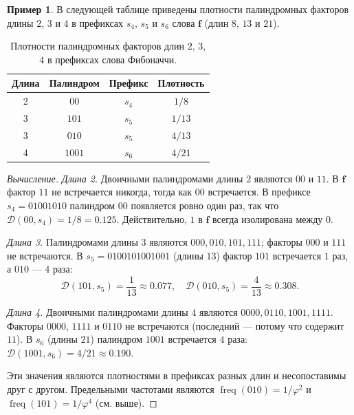 \documentclass[a4paper,14pt]{extreport}
\theoremstyle{plain}
\theoremstyle{definition}
\newtheorem{example}{Пример}
\theoremstyle{remark}
\begin{document}
\begin{example}\label{thm6.2}
	В следующей таблице приведены плотности палиндромных факторов длины $2$, $3$ и $4$
	в префиксах $s_4$, $s_5$ и $s_6$ слова $\mathbf f$ (длин $8$, $13$ и $21$).
	\begin{table}[ht!]
		\centering
		\caption{Плотности палиндромных факторов длин $2$, $3$, $4$ в префиксах слова Фибоначчи.}\label{tab1}
		\begin{tabular}{|c|c|c|c|}
			\hline\hline
			\textbf{Длина} & \textbf{Палиндром} & \textbf{Префикс} & \textbf{Плотность} \\ \hline\hline
			2 & $00$   & $s_4$ & $1/8$  \\ \hline
			3 & $101$  & $s_5$ & $1/13$ \\ \hline
			3 & $010$  & $s_5$ & $4/13$ \\ \hline
			4 & $1001$ & $s_6$ & $4/21$ \\ \hline
		\end{tabular}
	\end{table}
\end{example}

\begin{proof}[Вычисление]
	\emph{Длина 2.} Двоичными палиндромами длины $2$ являются $00$ и $11$. В $\mathbf f$ фактор
	$11$ не встречается никогда, тогда как $00$ встречается. В префиксе $s_4=01001010$ палиндром $00$ появляется ровно один раз, так что
	$\mathscr{D}(00,s_4)=1/8=0.125$. Действительно, $1$ в $\mathbf f$ всегда изолирована между $0$.
	
	\emph{Длина 3.} Палиндромами длины $3$ являются $000,010,101,111$; факторы $000$ и $111$
	не встречаются. В $s_5=0100101001001$ (длины $13$) фактор $101$ встречается $1$ раз, а $010$ --- $4$ раза:
	\begin{equation}
		\mathscr{D}(101,s_5) = \frac{1}{13} \approx 0.077, \quad \mathscr{D}(010,s_5) = \frac{4}{13} \approx 0.308.
	\end{equation}
	
	\emph{Длина 4.} Двоичными палиндромами длины $4$ являются $0000, 0110, 1001, 1111$. Факторы
	$0000$, $1111$ и $0110$ не встречаются (последний --- потому что содержит $11$). В $s_6$ (длины $21$) палиндром
	$1001$ встречается $4$ раза: $\mathscr{D}(1001,s_6) = 4/21 \approx 0.190$.
	
	Эти значения являются плотностями в префиксах разных длин и несопоставимы друг с другом.
	Предельными частотами являются $\operatorname{freq}(010)=1/\varphi^{2}$ и $\operatorname{freq}(101)=1/\varphi^{4}$ (см. выше).
\end{proof}
\end{document}

